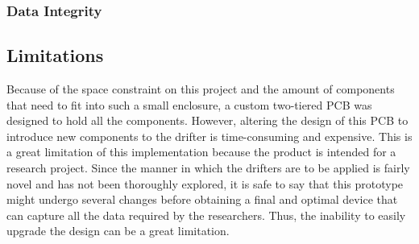 \subsubsection{Data Integrity}

\subsection{Limitations}
Because of the space constraint on this project and the amount of components that need to fit into such a small enclosure, a custom two-tiered PCB was designed to hold all the components.  However, altering the design of this PCB to introduce new components to the drifter is time-consuming and expensive.  This is a great limitation of this implementation because the product is intended for a research project.  Since the manner in which the drifters are to be applied is fairly novel and has not been thoroughly explored, it is safe to say that this prototype might undergo several changes before obtaining a final and optimal device that can capture all the data required by the researchers. Thus, the inability to easily upgrade the design can be a great limitation.